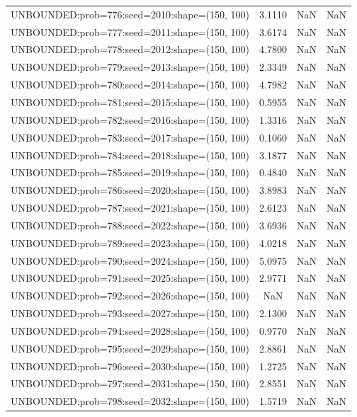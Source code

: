\begin{longtable}{lccc}
UNBOUNDED:prob=776:seed=2010:shape=(150, 100) &  3.1110 &   NaN &    NaN \\
UNBOUNDED:prob=777:seed=2011:shape=(150, 100) &  3.6174 &   NaN &    NaN \\
UNBOUNDED:prob=778:seed=2012:shape=(150, 100) &  4.7800 &   NaN &    NaN \\
UNBOUNDED:prob=779:seed=2013:shape=(150, 100) &  2.3349 &   NaN &    NaN \\
UNBOUNDED:prob=780:seed=2014:shape=(150, 100) &  4.7982 &   NaN &    NaN \\
UNBOUNDED:prob=781:seed=2015:shape=(150, 100) &  0.5955 &   NaN &    NaN \\
UNBOUNDED:prob=782:seed=2016:shape=(150, 100) &  1.3316 &   NaN &    NaN \\
UNBOUNDED:prob=783:seed=2017:shape=(150, 100) &  0.1060 &   NaN &    NaN \\
UNBOUNDED:prob=784:seed=2018:shape=(150, 100) &  3.1877 &   NaN &    NaN \\
UNBOUNDED:prob=785:seed=2019:shape=(150, 100) &  0.4840 &   NaN &    NaN \\
UNBOUNDED:prob=786:seed=2020:shape=(150, 100) &  3.8983 &   NaN &    NaN \\
UNBOUNDED:prob=787:seed=2021:shape=(150, 100) &  2.6123 &   NaN &    NaN \\
UNBOUNDED:prob=788:seed=2022:shape=(150, 100) &  3.6936 &   NaN &    NaN \\
UNBOUNDED:prob=789:seed=2023:shape=(150, 100) &  4.0218 &   NaN &    NaN \\
UNBOUNDED:prob=790:seed=2024:shape=(150, 100) &  5.0975 &   NaN &    NaN \\
UNBOUNDED:prob=791:seed=2025:shape=(150, 100) &  2.9771 &   NaN &    NaN \\
UNBOUNDED:prob=792:seed=2026:shape=(150, 100) &     NaN &   NaN &    NaN \\
UNBOUNDED:prob=793:seed=2027:shape=(150, 100) &  2.1300 &   NaN &    NaN \\
UNBOUNDED:prob=794:seed=2028:shape=(150, 100) &  0.9770 &   NaN &    NaN \\
UNBOUNDED:prob=795:seed=2029:shape=(150, 100) &  2.8861 &   NaN &    NaN \\
UNBOUNDED:prob=796:seed=2030:shape=(150, 100) &  1.2725 &   NaN &    NaN \\
UNBOUNDED:prob=797:seed=2031:shape=(150, 100) &  2.8551 &   NaN &    NaN \\
UNBOUNDED:prob=798:seed=2032:shape=(150, 100) &  1.5719 &   NaN &    NaN \\

\end{longtable}
